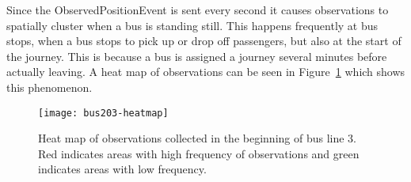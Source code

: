 Since the ObservedPositionEvent is sent every second it causes
observations to spatially cluster when a bus is standing still. This
happens frequently at bus stops, when a bus stops to pick up or drop
off passengers, but also at the start of the journey. This is because
a bus is assigned a journey several minutes before actually
leaving. A heat map of observations can be seen in
Figure~\ref{fig:bus203-heatmap} which shows this phenomenon.

\begin{figure}
  \centering
  \texttt{[image: bus203-heatmap]}
  \caption{Heat map of observations collected in the beginning of bus line 3. 
    Red indicates areas with high frequency of observations and green indicates areas with
    low frequency.}\label{fig:bus203-heatmap}
\end{figure}




